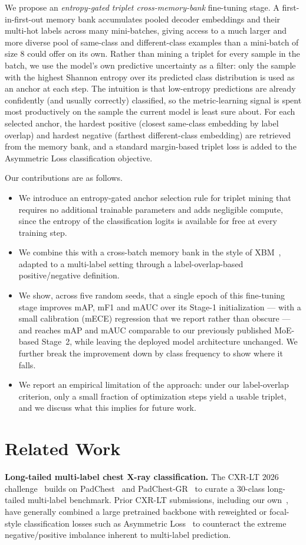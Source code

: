 \documentclass[conference]{IEEEtran}
\begin{document}
We propose an \emph{entropy-gated triplet cross-memory-bank} fine-tuning stage. A first-in-first-out memory bank accumulates pooled decoder embeddings and their multi-hot labels across many mini-batches, giving access to a much larger and more diverse pool of same-class and different-class examples than a mini-batch of size 8 could offer on its own. Rather than mining a triplet for every sample in the batch, we use the model's own predictive uncertainty as a filter: only the sample with the highest Shannon entropy over its predicted class distribution is used as an anchor at each step. The intuition is that low-entropy predictions are already confidently (and usually correctly) classified, so the metric-learning signal is spent most productively on the sample the current model is least sure about. For each selected anchor, the hardest positive (closest same-class embedding by label overlap) and hardest negative (farthest different-class embedding) are retrieved from the memory bank, and a standard margin-based triplet loss is added to the Asymmetric Loss classification objective.

Our contributions are as follows.
\begin{itemize}
\item We introduce an entropy-gated anchor selection rule for triplet mining that requires no additional trainable parameters and adds negligible compute, since the entropy of the classification logits is available for free at every training step.
\item We combine this with a cross-batch memory bank in the style of XBM~\cite{b6}, adapted to a multi-label setting through a label-overlap-based positive/negative definition.
\item We show, across five random seeds, that a single epoch of this fine-tuning stage improves mAP, mF1 and mAUC over its Stage-1 initialization --- with a small calibration (mECE) regression that we report rather than obscure --- and reaches mAP and mAUC comparable to our previously published MoE-based Stage~2, while leaving the deployed model architecture unchanged. We further break the improvement down by class frequency to show where it falls.
\item We report an empirical limitation of the approach: under our label-overlap criterion, only a small fraction of optimization steps yield a usable triplet, and we discuss what this implies for future work.
\end{itemize}

\section{Related Work}
\textbf{Long-tailed multi-label chest X-ray classification.} The CXR-LT 2026 challenge~\cite{b12} builds on PadChest~\cite{b9} and PadChest-GR~\cite{b10} to curate a 30-class long-tailed multi-label benchmark. Prior CXR-LT submissions, including our own~\cite{b12}, have generally combined a large pretrained backbone with reweighted or focal-style classification losses such as Asymmetric Loss~\cite{b3} to counteract the extreme negative/positive imbalance inherent to multi-label prediction.
\end{document}

